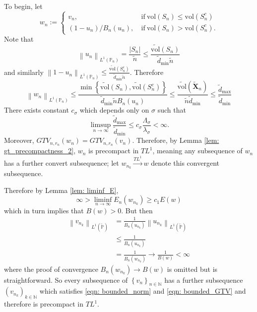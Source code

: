 \documentclass{article}
\newcommand{\norm}[1]{\left\lVert#1\right\rVert}
\newcommand{\abs}[1]{\left \lvert #1 \right \rvert}
\newcommand{\set}[1]{\left\{#1\right\}}
\newcommand{\seq}[1]{\set{#1}_{n \in \N}}
\newcommand{\Naturals}{\mathbb{N}}
\newcommand{\N}{\mathbb{N}}
\newcommand{\Xbf}{\mathbf{X}}
\newcommand{\Pbb}{\mathbb{P}}
\newcommand{\1}{\mathbf{1}}
\newcommand{\vol}{\mathrm{vol}}
\theoremstyle{alden}
\theoremstyle{aldenthm}
\theoremstyle{remark}
\begin{document}
To begin, let
\begin{equation*}
w_n := 
\begin{cases}
v_n,~ & \text{if}~ \vol(S_n) \leq \vol(S_n^c)  \\
(1 - u_n)/B_n(u_n),~ & \text{if}~ \vol(S_n) > \vol(S_n^c).
\end{cases}
\end{equation*}
Note that 
\begin{equation*}
\norm{u_n}_{L^1(\Pbb_n)} = \frac{\abs{S_n}}{\widetilde{n}} \leq \frac{\widetilde{\vol}(S_n)}{\widetilde{d}_{\min} \widetilde{n}}
\end{equation*}
and similarly $\norm{1 - u_n}_{L^1(\Pbb_n)} \leq \frac{\widetilde{\vol}(S_n^c)}{\widetilde{d}_{\min} \widetilde{n}}$. Therefore
\begin{equation*}
\norm{w_n}_{L^1(\Pbb_n)} \leq \frac{\min \set{\widetilde{\vol}(S_n),\widetilde{\vol}(S_n^c)}}{\widetilde{d}_{\min} \widetilde{n} B_n(u_n)} \leq \frac{\widetilde{\vol}(\widetilde{\Xbf}_n)}{\widetilde{n} \widetilde{d}_{\min}} \leq \frac{\widetilde{d}_{\max}}{\widetilde{d}_{\min}}
\end{equation*}
There exists constant $c_{\sigma}$ which depends only on $\sigma$ such that
\begin{equation*}
\limsup_{n \to \infty} \frac{\widetilde{d}_{\max}}{\widetilde{d}_{\min}} \leq c_{\sigma}\frac{\Lambda_{\sigma}}{\lambda_{\sigma}} < \infty.
\end{equation*}
Moreover, $GTV_{n,r_n}(w_n) = GTV_{n,r_n}(v_n)$. Therefore, by Lemma \ref{lem: gt_precompactness_2}, $w_n$ is precompact in $TL^1$, meaning any subsequence of $w_n$ has a further convert subsequence; let $w_{n_k} \overset{TL^1}{\to} w$ denote this convergent subsequence. 

Therefore by Lemma \ref{lem: liminf_E}, 
\begin{equation*}
\infty > \liminf_{n \to \infty} E_n(w_{n_k}) \geq c_1 E(w)
\end{equation*}
which in turn implies that $B(w) > 0$. But then
\begin{align*}
\norm{v_{n_k}}_{L^1(\widetilde{\Pbb})}  & = \frac{1}{B_n(u_{n_k})} \norm{u_{n_k}}_{L^1(\widetilde{\Pbb})} \\
& \leq \frac{1}{B_n(u_{n_k})} \\
& = \frac{1}{B_n(w_{n_k})} \to \frac{1}{B(w)} < \infty
\end{align*}
where the proof of convergence $B_n(w_{n_k}) \to B(w)$ is omitted but is straightforward. So every subsequence of $\seq{v_n}$ has a further subsequence $(v_{n_k})_{k \in \Naturals}$ which satisfies \eqref{eqn: bounded_norm} and \eqref{eqn: bounded_GTV} and therefore is precompact in $TL^1$. 
\end{document}
